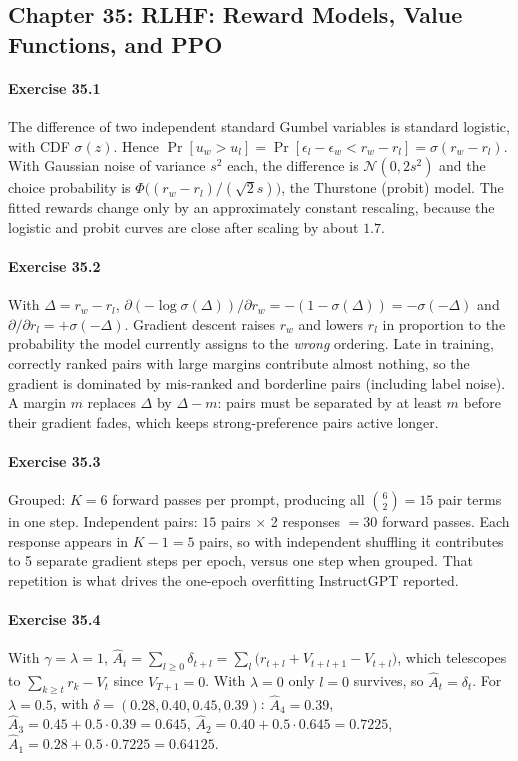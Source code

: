 \subsection*{Chapter 35: RLHF: Reward Models, Value Functions, and PPO}

\paragraph{Exercise 35.1} The difference of two independent standard Gumbel variables is
standard logistic, with CDF $\sigma(z)$. Hence $\Pr[u_w>u_l]=\Pr[\epsilon_l-\epsilon_w<r_w-r_l]=\sigma(r_w-r_l)$.
With Gaussian noise of variance $s^2$ each, the difference is $\mathcal N(0,2s^2)$ and the choice
probability is $\Phi\big((r_w-r_l)/(\sqrt2 s)\big)$, the Thurstone (probit) model. The fitted rewards
change only by an approximately constant rescaling, because the logistic and probit curves are close after
scaling by about $1.7$.

\paragraph{Exercise 35.2} With $\Delta=r_w-r_l$, $\partial(-\log\sigma(\Delta))/\partial r_w=-(1-\sigma(\Delta))=-\sigma(-\Delta)$
and $\partial/\partial r_l=+\sigma(-\Delta)$. Gradient descent raises $r_w$ and lowers $r_l$ in
proportion to the probability the model currently assigns to the \emph{wrong} ordering. Late in training,
correctly ranked pairs with large margins contribute almost nothing, so the gradient is dominated by
mis-ranked and borderline pairs (including label noise). A margin $m$ replaces $\Delta$ by $\Delta-m$: pairs
must be separated by at least $m$ before their gradient fades, which keeps strong-preference pairs active longer.

\paragraph{Exercise 35.3} Grouped: $K=6$ forward passes per prompt, producing all
$\binom{6}{2}=15$ pair terms in one step. Independent pairs: $15$ pairs $\times$ 2 responses $=30$ forward
passes. Each response appears in $K-1=5$ pairs, so with independent shuffling it contributes to 5
separate gradient steps per epoch, versus one step when grouped. That repetition is what drives the
one-epoch overfitting InstructGPT reported.

\paragraph{Exercise 35.4} With $\gamma=\lambda=1$, $\hat A_t=\sum_{l\ge0}\delta_{t+l}=\sum_{l}\big(r_{t+l}+V_{t+l+1}-V_{t+l}\big)$,
which telescopes to $\sum_{k\ge t}r_k-V_t$ since $V_{T+1}=0$. With $\lambda=0$ only $l=0$ survives,
so $\hat A_t=\delta_t$. For $\lambda=0.5$, with $\delta=(0.28,0.40,0.45,0.39)$:
$\hat A_4=0.39$, $\hat A_3=0.45+0.5\cdot0.39=0.645$, $\hat A_2=0.40+0.5\cdot0.645=0.7225$,
$\hat A_1=0.28+0.5\cdot0.7225=0.64125$.

